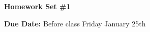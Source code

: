 
\usepackage{braket}

\def\ketY{\ensuremath{\ket {\Psi}}}
\def\iGeV{\ensuremath{\textrm{GeV}^{-1}}}
\def\mp{\ensuremath{m_{\textrm{proton}}}}
\def\rp{\ensuremath{r_{\textrm{proton}}}}
\def\me{\ensuremath{m_{\textrm{electron}}}}
\def\aG{\ensuremath{\alpha_G}}
\def\rAtom{\ensuremath{r_{\textrm{atom}}}}
\def\rNucl{\ensuremath{r_{\textrm{nucleus}}}}
\def\GN{\ensuremath{\textrm{G}_\textrm{N}}}


\usepackage{fancyhdr}

\fancyhf{}

\thispagestyle{fancy}






\begin{center}
{\huge \textbf{Homework Set \#1}}
\large

{\textbf{ Due Date:} Before class Friday January 25th  }
\end{center}

